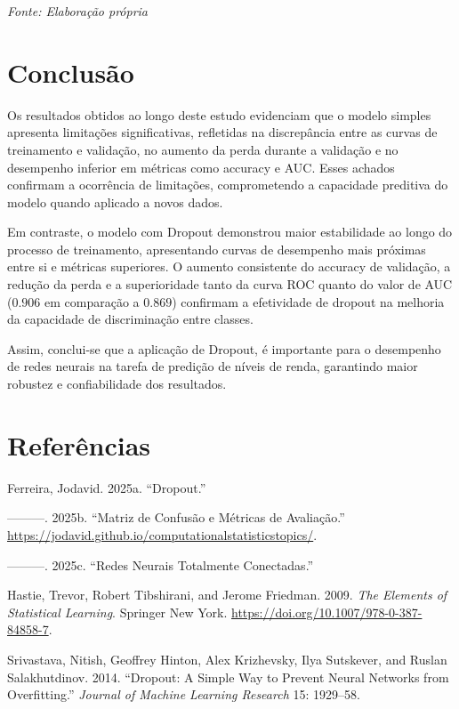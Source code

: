 \documentclass[
  oneclumn]{article}
\newlength{\cslhangindent}
\newenvironment{CSLReferences}[2] %
 {\begin{list}{}{%
  \setlength{\itemindent}{0pt}
  \setlength{\leftmargin}{0pt}
  \setlength{\parsep}{0pt}
  \ifodd #1
   \setlength{\leftmargin}{\cslhangindent}
   \setlength{\itemindent}{-1\cslhangindent}
  \fi
  \setlength{\itemsep}{#2\baselineskip}}}
 {\end{list}}
\begin{document}
\begin{center}
\footnotesize \textit{Fonte: Elaboração própria}
\end{center}

\section{Conclusão}\label{conclusuxe3o}

Os resultados obtidos ao longo deste estudo evidenciam que o modelo
simples apresenta limitações significativas, refletidas na discrepância
entre as curvas de treinamento e validação, no aumento da perda durante
a validação e no desempenho inferior em métricas como accuracy e AUC.
Esses achados confirmam a ocorrência de limitações, comprometendo a
capacidade preditiva do modelo quando aplicado a novos dados.

Em contraste, o modelo com Dropout demonstrou maior estabilidade ao
longo do processo de treinamento, apresentando curvas de desempenho mais
próximas entre si e métricas superiores. O aumento consistente do
accuracy de validação, a redução da perda e a superioridade tanto da
curva ROC quanto do valor de AUC (\(0.906\) em comparação a \(0.869\))
confirmam a efetividade de dropout na melhoria da capacidade de
discriminação entre classes.

Assim, conclui-se que a aplicação de Dropout, é importante para o
desempenho de redes neurais na tarefa de predição de níveis de renda,
garantindo maior robustez e confiabilidade dos resultados.

\section{Referências}\label{referuxeancias}

\label{refs}
\begin{CSLReferences}{1}{0}
Ferreira, Jodavid. 2025a. {``Dropout.''}

---------. 2025b. {``Matriz de Confusão e Métricas de Avaliação.''}
\url{https://jodavid.github.io/computationalstatisticstopics/}.

---------. 2025c. {``Redes Neurais Totalmente Conectadas.''}

Hastie, Trevor, Robert Tibshirani, and Jerome Friedman. 2009. \emph{The
Elements of Statistical Learning}. Springer New York.
\url{https://doi.org/10.1007/978-0-387-84858-7}.

Srivastava, Nitish, Geoffrey Hinton, Alex Krizhevsky, Ilya Sutskever,
and Ruslan Salakhutdinov. 2014. {``Dropout: A Simple Way to Prevent
Neural Networks from Overfitting.''} \emph{Journal of Machine Learning
Research} 15: 1929--58.

\end{CSLReferences}
\end{document}
